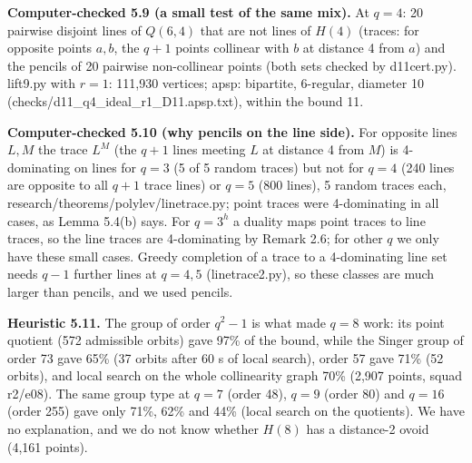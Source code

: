 \documentclass[
  10pt,
]{article}
\begin{document}
\textbf{Computer-checked 5.9 (a small test of the same mix).} At
\(q = 4\): 20 pairwise disjoint lines of \(Q(6,4)\) that are not lines
of \(H(4)\) (traces: for opposite points \(a, b\), the \(q+1\) points
collinear with \(b\) at distance 4 from \(a\)) and the pencils of 20
pairwise non-collinear points (both sets checked by d11cert.py).
lift9.py with \(r = 1\): 111,930 vertices; apsp: bipartite, 6-regular,
diameter 10 (checks/d11\_q4\_ideal\_r1\_D11.apsp.txt), within the bound
11.

\textbf{Computer-checked 5.10 (why pencils on the line side).} For
opposite lines \(L, M\) the trace \(L^M\) (the \(q+1\) lines meeting
\(L\) at distance 4 from \(M\)) is 4-dominating on lines for \(q = 3\)
(5 of 5 random traces) but not for \(q = 4\) (240 lines are opposite to
all \(q+1\) trace lines) or \(q = 5\) (800 lines), 5 random traces each,
research/theorems/polylev/linetrace.py; point traces were 4-dominating
in all cases, as Lemma 5.4(b) says. For \(q = 3^h\) a duality maps point
traces to line traces, so the line traces are 4-dominating by Remark
2.6; for other \(q\) we only have these small cases. Greedy completion
of a trace to a 4-dominating line set needs \(q-1\) further lines at
\(q = 4, 5\) (linetrace2.py), so these classes are much larger than
pencils, and we used pencils.

\textbf{Heuristic 5.11.} The group of order \(q^2-1\) is what made
\(q = 8\) work: its point quotient (572 admissible orbits) gave 97\% of
the bound, while the Singer group of order 73 gave 65\% (37 orbits after
60 s of local search), order 57 gave 71\% (52 orbits), and local search
on the whole collinearity graph 70\% (2,907 points, squad r2/e08). The
same group type at \(q = 7\) (order 48), \(q = 9\) (order 80) and
\(q = 16\) (order 255) gave only 71\%, 62\% and 44\% (local search on
the quotients). We have no explanation, and we do not know whether
\(H(8)\) has a distance-2 ovoid (4,161 points).
\end{document}
